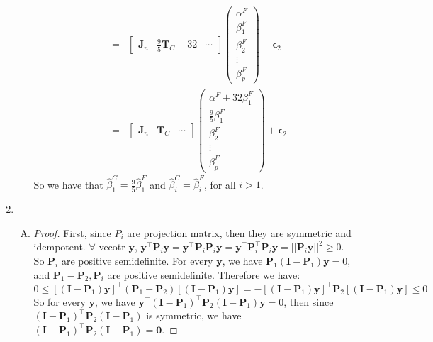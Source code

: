 \documentclass[12pt]{article}
\newcommand{\ttt}[1]{\textbf{#1}}
\begin{document}
\begin{enumerate}
\begin{enumerate}[A.]
\begin{eqnarray}
                    &=& \begin{bmatrix} \ttt{J}_n & \frac{9}{5}\ttt{T}_C + 32 & \cdots \end{bmatrix} \begin{pmatrix} \alpha^F\\ \beta^F_1\\ \beta^F_2\\ \vdots\\ \beta^F_p \end{pmatrix} + \bm{\epsilon}_2 \\
                    &=& \begin{bmatrix} \ttt{J}_n&\ttt{T}_C&\cdots \end{bmatrix} \begin{pmatrix} \alpha^F + 32 \beta^F_1 \\ \frac{9}{5} \beta^F_1\\ \beta^F_2\\ \vdots\\ \beta^F_p \end{pmatrix} + \bm{\epsilon}_2
        \end{eqnarray}
        So we have that $\hat{\beta}^C_1 = \frac{9}{5} \hat{\beta}^F_1$ and $\hat{\beta}^C_i = \hat{\beta}^F_i$, for all $i > 1$.
    \end{enumerate}

    \item
    \begin{enumerate}[A.]
        \item 
        \begin{proof}
            First, since $P_i$ are projection matrix, then they are symmetric and idempotent. $\forall$ vecotr $\ttt{y}$, $\ttt{y}^\top \ttt{P}_i \ttt{y} = \ttt{y}^\top \ttt{P}_i \ttt{P}_i \ttt{y} = \ttt{y}^\top \ttt{P}_i^\top \ttt{P}_i \ttt{y} = ||\ttt{P}_i \ttt{y}||^2 \ge 0$. So $\ttt{P}_i$ are positive semidefinite.
            For every $\ttt{y}$, we have $\ttt{P}_1 (\ttt{I} - \ttt{P}_1) \ttt{y} = 0$, and $\ttt{P}_1 - \ttt{P}_2, \ttt{P}_i$ are positive semidefinite. Therefore we have:
            $$0 \le [(\ttt{I} - \ttt{P}_1)\ttt{y}]^\top (\ttt{P}_1 - \ttt{P}_2) [(\ttt{I} - \ttt{P}_1)\ttt{y}] = - [(\ttt{I} - \ttt{P}_1)\ttt{y}]^\top \ttt{P}_2 [(\ttt{I} - \ttt{P}_1)\ttt{y}] \le 0$$
            So for every $\ttt{y}$, we have $\ttt{y}^\top (\ttt{I} - \ttt{P}_1)^\top \ttt{P}_2 (\ttt{I} - \ttt{P}_1) \ttt{y} = 0$, then since $(\ttt{I} - \ttt{P}_1)^\top \ttt{P}_2 (\ttt{I} - \ttt{P}_1)$ is symmetric, we have $(\ttt{I} - \ttt{P}_1)^\top \ttt{P}_2 (\ttt{I} - \ttt{P}_1) = \ttt{0}$.
            

\end{proof}
\end{enumerate}
\end{enumerate}
\end{document}
